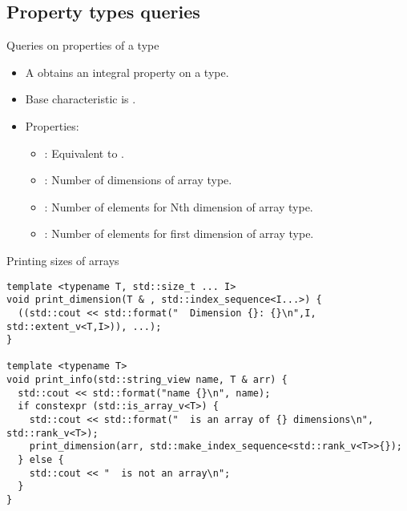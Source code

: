 \subsection{Property types queries}

\begin{frame}[t,fragile]{Queries on properties of a type}
\begin{itemize}
  \item A  obtains an integral property 
        on a type.
  
  \item Base characteristic is .

  \item Properties:
    \begin{itemize}
      \item {}: Equivalent to .
      \item {}: Number of dimensions of array type.
      \item {}: Number of elements for Nth dimension of array type.
      \item {}: Number of elements for first dimension of array type.
    \end{itemize}
\end{itemize}
\end{frame}

\begin{frame}[t,fragile]
\begin{block}{Printing sizes of arrays}
\begin{lstlisting}
template <typename T, std::size_t ... I>
void print_dimension(T & , std::index_sequence<I...>) { 
  ((std::cout << std::format("  Dimension {}: {}\n",I, std::extent_v<T,I>)), ...);
}

template <typename T>
void print_info(std::string_view name, T & arr) {
  std::cout << std::format("name {}\n", name);
  if constexpr (std::is_array_v<T>) {
    std::cout << std::format("  is an array of {} dimensions\n", std::rank_v<T>);
    print_dimension(arr, std::make_index_sequence<std::rank_v<T>>{});
  } else {
    std::cout << "  is not an array\n";
  }
}
\end{lstlisting}
\end{block}
\end{frame}
